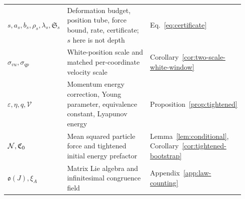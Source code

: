 \begin{longtable}{@{}>{\raggedright\arraybackslash}p{0.21\linewidth}
 >{\raggedright\arraybackslash}p{0.53\linewidth}
 >{\raggedright\arraybackslash}p{0.20\linewidth}@{}}
\(s,a_s,b_s,\rho_s,\lambda_s,\mathfrak S_s\)&Deformation budget, position tube, force bound, rate, certificate; \(s\) here is not depth&Eq.~\eqref{eq:certificate}\\
\(\sigma_{vu},\sigma_{qp}\)&White-position scale and matched per-coordinate velocity scale&Corollary~\ref{cor:two-scale-white-window}\\
\(\varepsilon,\eta,q,\mathcal V\)&Momentum energy correction, Young parameter, equivalence constant, Lyapunov energy&Proposition~\ref{prop:tightened}\\
\(\mathcal N,\mathfrak C_0\)&Mean squared particle force and tightened initial energy prefactor&Lemma~\ref{lem:conditional}, Corollary~\ref{cor:tightened-bootstrap}\\
\(\mathfrak o(J),\xi_A\)&Matrix Lie algebra and infinitesimal congruence field&Appendix~\ref{app:law-counting}\\
\bottomrule
\end{longtable}
\endgroup
